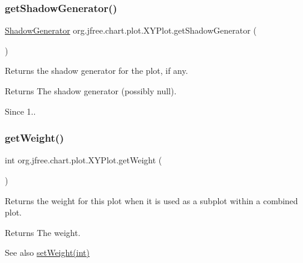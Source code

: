 \subsubsection{\texorpdfstring{get\+Shadow\+Generator()}{getShadowGenerator()}}
{\footnotesize\ttfamily \mbox{\hyperlink{interfaceorg_1_1jfree_1_1chart_1_1util_1_1_shadow_generator}{Shadow\+Generator}} org.\+jfree.\+chart.\+plot.\+X\+Y\+Plot.\+get\+Shadow\+Generator (\begin{DoxyParamCaption}{ }\end{DoxyParamCaption})}

Returns the shadow generator for the plot, if any.

\begin{DoxyReturn}{Returns}
The shadow generator (possibly {\ttfamily null}).
\end{DoxyReturn}
\begin{DoxySince}{Since}
1.. 
\end{DoxySince}
\mbox{\label{classorg_1_1jfree_1_1chart_1_1plot_1_1_x_y_plot_a98d5fc48e4f913f8b3dd35c8b7a803c6}} 
\subsubsection{\texorpdfstring{get\+Weight()}{getWeight()}}
{\footnotesize\ttfamily int org.\+jfree.\+chart.\+plot.\+X\+Y\+Plot.\+get\+Weight (\begin{DoxyParamCaption}{ }\end{DoxyParamCaption})}

Returns the weight for this plot when it is used as a subplot within a combined plot.

\begin{DoxyReturn}{Returns}
The weight.
\end{DoxyReturn}
\begin{DoxySeeAlso}{See also}
\mbox{\hyperlink{classorg_1_1jfree_1_1chart_1_1plot_1_1_x_y_plot_afaafdbf238357cc108dd1972fa94a7f3}{set\+Weight(int)}} 
\end{DoxySeeAlso}
\mbox{\label{classorg_1_1jfree_1_1chart_1_1plot_1_1_x_y_plot_a8ab341efdd12324ed11a95cbc9e755d7}} 
